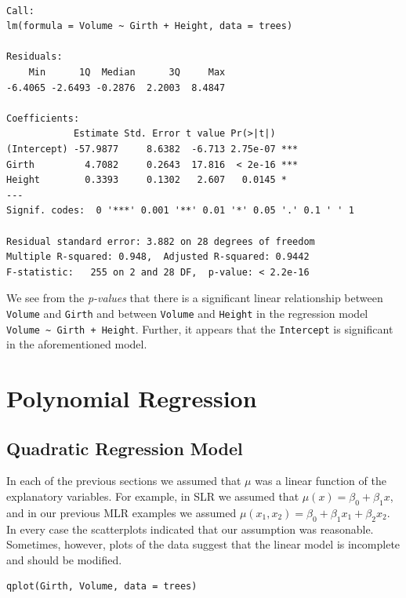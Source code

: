 \documentclass[captions=tableheading]{scrbook}
\begin{document}
\begin{verbatim}

Call:
lm(formula = Volume ~ Girth + Height, data = trees)

Residuals:
    Min      1Q  Median      3Q     Max 
-6.4065 -2.6493 -0.2876  2.2003  8.4847 

Coefficients:
            Estimate Std. Error t value Pr(>|t|)    
(Intercept) -57.9877     8.6382  -6.713 2.75e-07 ***
Girth         4.7082     0.2643  17.816  < 2e-16 ***
Height        0.3393     0.1302   2.607   0.0145 *  
---
Signif. codes:  0 '***' 0.001 '**' 0.01 '*' 0.05 '.' 0.1 ' ' 1 

Residual standard error: 3.882 on 28 degrees of freedom
Multiple R-squared: 0.948,	Adjusted R-squared: 0.9442 
F-statistic:   255 on 2 and 28 DF,  p-value: < 2.2e-16
\end{verbatim}

We see from the \emph{p-values} that there is a significant linear relationship between \texttt{Volume} and \texttt{Girth} and between \texttt{Volume} and \texttt{Height} in the regression model \texttt{Volume \textasciitilde{} Girth + Height}. Further, it appears that the \texttt{Intercept} is significant in the aforementioned model.
\section{Polynomial Regression}
\label{sec-1-4}

\label{sec:Polynomial-Regression}
\subsection{Quadratic Regression Model}
\label{sec-1-4-1}


In each of the previous sections we assumed that $\mu$ was a linear function of the explanatory variables. For example, in SLR we assumed that $\mu(x)=\beta_{0}+\beta_{1}x$, and in our previous MLR examples we assumed $\mu(x_{1},x_{2})=\beta_{0}+\beta_{1}x_{1}+\beta_{2}x_{2}$. In every case the scatterplots indicated that our assumption was reasonable. Sometimes, however, plots of the data suggest that the linear model is incomplete and should be modified.


\begin{verbatim}
qplot(Girth, Volume, data = trees)
\end{verbatim}
\end{document}
